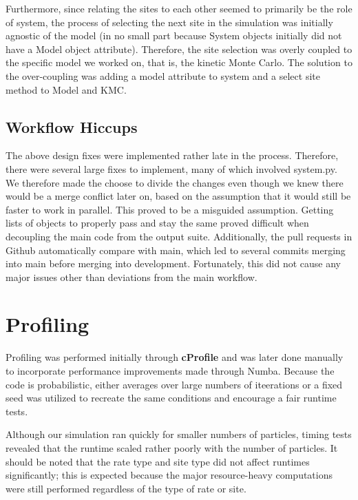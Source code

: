 \documentclass{article}
\begin{document}
Furthermore, since relating the sites to each other seemed to primarily be the role of system, the process of selecting the next site in the simulation was initially agnostic of the model (in no small part because System objects initially did not have a Model object attribute). Therefore, the site selection was overly coupled to the specific model we worked on, that is, the kinetic Monte Carlo. The solution to the over-coupling was adding a model attribute to system and a select site method to Model and KMC. 

\subsection{Workflow Hiccups}

The above design fixes were implemented rather late in the process. Therefore, there were several large fixes to implement, many of which involved system.py. We therefore made the choose to divide the changes even though we knew there would be a merge conflict later on, based on the assumption that it would still be faster to work in parallel. This proved to be a misguided assumption. Getting lists of objects to properly pass and stay the same proved difficult when decoupling the main code from the output suite. Additionally, the pull requests in Github automatically compare with main, which led to several commits merging into main before merging into development. Fortunately, this did not cause any major issues other than deviations from the main workflow.





\section{Profiling}
Profiling was performed  initially through \textbf{cProfile} and was later done manually to incorporate performance improvements made through Numba. Because the code is probabilistic, either averages over large numbers of iteerations or a fixed seed was utilized to recreate the same conditions and encourage a fair runtime tests. 

\vspace{.15in}
Although our simulation ran quickly for smaller numbers of particles, timing tests revealed that the runtime scaled rather poorly with the number of particles. It should be noted that the rate type and site type did not affect runtimes significantly; this is expected because the major resource-heavy computations were still performed regardless of the type of rate or site. 
\end{document}
